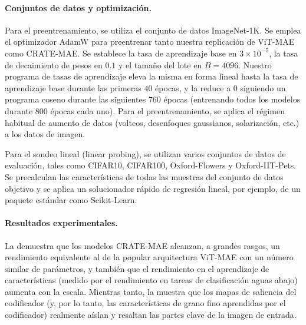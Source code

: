 \documentclass[../../book-main_es.tex]{subfiles}
\begin{document}
\paragraph{Conjuntos de datos y optimización.} Para el preentrenamiento, se utiliza el
conjunto de datos ImageNet-1K. Se emplea el optimizador AdamW para preentrenar tanto nuestra
replicación de ViT-MAE como CRATE-MAE. Se establece la tasa de aprendizaje
base en \(3 \times 10^{-5}\), la tasa de decaimiento de pesos en \(0.1\) y el tamaño del lote
en \(B = 4096\). Nuestro programa de tasas de aprendizaje eleva la misma
en forma lineal hasta la tasa de aprendizaje base durante las primeras
\(40\) épocas, y la reduce a \(0\) siguiendo un programa coseno durante
las siguientes \(760\) épocas (entrenando todos los modelos durante \(800\) épocas
cada uno). Para el preentrenamiento, se aplica el régimen habitual de
aumento de datos (volteos, desenfoques gaussianos, solarización, etc.) a los datos de imagen.

Para el sondeo lineal (linear probing), se utilizan varios conjuntos de datos de evaluación, tales como
CIFAR10, CIFAR100, Oxford-Flowers y Oxford-IIT-Pets. 
Se precalculan las características de todas las muestras del conjunto de datos
objetivo y se aplica un solucionador rápido de regresión lineal, por ejemplo, de un
paquete estándar como Scikit-Learn.

\paragraph{Resultados experimentales.} La 
demuestra que los modelos CRATE-MAE alcanzan, a grandes rasgos, un rendimiento equivalente
al de la popular arquitectura ViT-MAE con un número similar de parámetros,
y también que el rendimiento en el aprendizaje de características (medido por
el rendimiento en tareas de clasificación aguas abajo) aumenta con la escala.
Mientras tanto, la  muestra que los
mapas de saliencia del codificador (y, por lo tanto, las características de grano fino 
aprendidas por el codificador) realmente aíslan y resaltan las partes clave de
la imagen de entrada.
\end{document}

